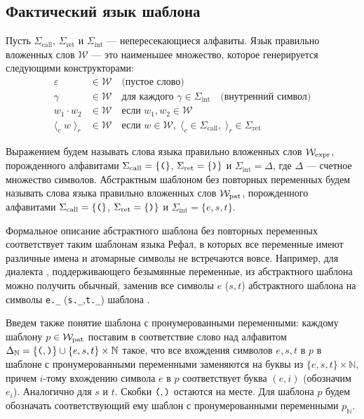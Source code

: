 \subsection{Фактический язык шаблона}\label{sec:fact-pattern-lang} %

\begin{Definition}
  \label{Def::PLIS}
  Пусть $\Sigma_{\text{call}}$, $\Sigma_{\text{ret}}$ и $\Sigma_{\text{int}}$ --- непересекающиеся алфавиты. 
  Язык правильно вложенных слов $\mathcal{W}$ --- это наименьшее множество, 
  которое генерируется следующими конструкторами:
  \begin{align*}
  \varepsilon &\in \mathcal{W} \quad \text{(пустое слово)} \\
  \gamma &\in \mathcal{W} \quad \text{для каждого } \gamma \in \Sigma_{\text{int}} \quad \text{(внутренний символ)} \\
  w_1 \cdot w_2 &\in \mathcal{W} \quad \text{если } w_1, w_2 \in \mathcal{W}  \\
  \langle_c \; w \; \rangle_r &\in \mathcal{W} \quad \text{если } w \in \mathcal{W},\; \langle_c \in \Sigma_{\text{call}},\; \rangle_r \in \Sigma_{\text{ret}} 
  \end{align*}
\end{Definition}

Выражением будем называть слова языка правильно вложенных слов $\mathcal{W}_{\text{expr}}$, 
порожденного алфавитами $\Sigma_{\text{call}} = \{\textnormal{\texttt{(}}\}$, 
$\Sigma_{\text{ret}} = \{\textnormal{\texttt{)}}\}$ и $\Sigma_{\text{int}} = \Delta$, 
где $\Delta$ --- счетное множество символов.
Абстрактным шаблоном без повторных переменных будем называть слова языка правильно вложенных слов $\mathcal{W}_{\text{pat}}$, 
порожденного алфавитами $\Sigma_{\text{call}} = \{\textnormal{\texttt{(}}\}$, 
$\Sigma_{\text{ret}} = \{\textnormal{\texttt{)}}\}$ и $\Sigma_{\text{int}} = \{e, s, t\}$.

\begin{Remark}
Формальное описание абстрактного шаблона без повторных переменных соответствует таким шаблонам языка Рефал, в которых все переменные имеют различные имена и атомарные символы не встречаются вовсе.
Например, для диалекта \RL, поддерживающего безымянные переменные,
из абстрактного шаблона можно получить обычный, заменив все символы $e$ ($s, t$)
абстрактного шаблона на символы \texttt{e.\_} (\texttt{s.\_},\texttt{t.\_}) шаблона \RL.
\end{Remark}

Введем также понятие шаблона с пронумерованными переменными: каждому шаблону $p \in \mathcal{W}_{\text{pat}}$ 
поставим в соответствие слово над алфавитом $\Delta_\mathbb{N} = \{\textnormal{\texttt{(}}, \textnormal{\texttt{)}}\} \cup \{e, s, t\} \times \mathbb{N}$ такое,
что все вхождения символов $e, s, t$ в $p$ в шаблоне с пронумерованными переменными 
заменяются на буквы из $\{e, s, t\} \times \mathbb{N}$, причем $i$-тому вхождению 
символа $e$ в $p$ соответствует буква $(e, i)$ (обозначим $e_i$). Аналогично для $s$ и $t$. 
Скобки $\textnormal{\texttt{(}}, \textnormal{\texttt{)}}$ остаются на месте. Для шаблона $p$ будем обозначать соответствующий ему 
шаблон с пронумерованными переменными $p_\mathbb{N}.$

